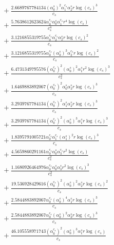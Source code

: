 \documentclass[10pt]{article}
\begin{document}
\begin{align*}
&{}  + \frac{2.6689767784134 \left(\alpha_{0}^s\right)^{2} \alpha_{1}^{c_s} \alpha_{2}^s r \log{\left(c_{s} \right)}^{3}}{c_{s}} \\
&{}  + \frac{5.7638612623624 \alpha_{0}^{c_s} \alpha_{0}^s \alpha_{1}^{c_s} r^{4} \log{\left(c_{s} \right)}}{c_{s}^{4}} \\
&{}  + \frac{3.1216855319755 \alpha_{0}^{c_s} \alpha_{2}^{c_s} \alpha_{2}^s r \log{\left(c_{s} \right)}^{2}}{c_{s}} \\
&{}  + \frac{3.1216855319755 \alpha_{0}^{c_s} \left(\alpha_{0}^s\right)^{3} \alpha_{2}^{c_s} r \log{\left(c_{s} \right)}^{2}}{c_{s}} \\
&{}  + \frac{6.4731349795576 \left(\alpha_{0}^{c_s}\right)^{2} \left(\alpha_{0}^s\right)^{2} \alpha_{1}^s r^{2} \log{\left(c_{s} \right)}^{3}}{c_{s}^{2}} \\
&{}  + \frac{1.6469883892067 \left(\alpha_{0}^{c_s}\right)^{2} \alpha_{0}^s \alpha_{3}^s r \log{\left(c_{s} \right)}^{3}}{c_{s}} \\
&{}  + \frac{3.2939767784134 \left(\alpha_{0}^{c_s}\right)^{2} \alpha_{1}^s \alpha_{2}^s r \log{\left(c_{s} \right)}^{3}}{c_{s}} \\
&{}  + \frac{3.2939767784134 \left(\alpha_{0}^{c_s}\right)^{2} \left(\alpha_{0}^s\right)^{3} \alpha_{1}^s r \log{\left(c_{s} \right)}^{3}}{c_{s}} \\
&{}  + \frac{1.8395791005721 \alpha_{0}^{c_s} \alpha_{1}^{c_s} \left(\alpha_{1}^s\right)^{2} r \log{\left(c_{s} \right)}^{3}}{c_{s}} \\
&{}  + \frac{4.5659860291161 \alpha_{0}^{c_s} \alpha_{0}^s \alpha_{3}^{c_s} r^{2} \log{\left(c_{s} \right)}}{c_{s}^{2}} \\
&{}  + \frac{1.1680926464976 \alpha_{0}^{c_s} \alpha_{0}^s \alpha_{3}^s r^{2} \log{\left(c_{s} \right)}^{3}}{c_{s}^{2}} \\
&{}  + \frac{19.536928429616 \left(\alpha_{0}^{c_s}\right)^{2} \left(\alpha_{0}^s\right)^{2} \alpha_{2}^s r \log{\left(c_{s} \right)}^{2}}{c_{s}} \\
&{}  + \frac{2.5844883892067 \alpha_{0}^{c_s} \left(\alpha_{0}^s\right)^{4} \alpha_{1}^s r \log{\left(c_{s} \right)}^{3}}{c_{s}} \\
&{}  + \frac{2.5844883892067 \alpha_{0}^{c_s} \left(\alpha_{0}^s\right)^{2} \alpha_{3}^s r \log{\left(c_{s} \right)}^{3}}{c_{s}} \\
&{}  + \frac{46.105558971743 \left(\alpha_{0}^{c_s}\right)^{2} \left(\alpha_{0}^s\right)^{3} \alpha_{1}^s r \log{\left(c_{s} \right)}}{c_{s}} \\

\end{align*}
\end{document}
